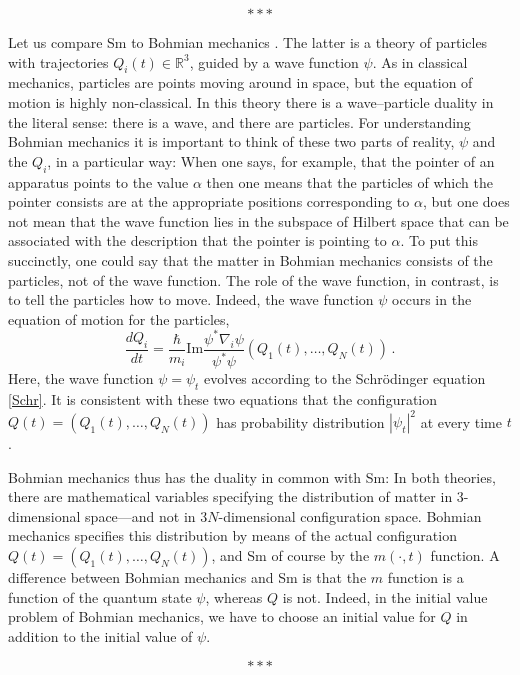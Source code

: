 \documentclass[12pt]{article}
\renewcommand{\Im}{\mathrm{Im}}
\newcommand{\RRR}{\mathbb{R}}
\begin{document}
\[***\]

Let us compare Sm to Bohmian mechanics \cite{Bohm52,Bell66,Gol98}. The latter is a theory of particles with trajectories $Q_i(t) \in \RRR^3$, guided by a wave function $\psi$. As in classical mechanics, particles are points moving around in space, but the equation of motion is highly non-classical. In this theory there is a wave--particle duality in the literal sense: there is a wave, and there are particles. For understanding Bohmian mechanics it is important to think of these two parts of reality, $\psi$ and the $Q_i$, in a particular way: When one says, for example, that the pointer of an apparatus points to the value $\alpha$ then one means that the particles of which the pointer consists are at the appropriate positions corresponding to $\alpha$, but one does not mean that the wave function lies in the subspace of Hilbert space that can be associated with the description that the pointer is pointing to $\alpha$. To put this succinctly, one could say that the matter in Bohmian mechanics consists of the particles, not of the wave function. The role of the wave function, in contrast, is to tell the particles how to move. Indeed, the wave function $\psi$ occurs in the equation of motion for the particles,
\begin{equation}\label{Bohm}
  \frac{dQ_i}{dt} = \frac{\hbar}{m_i} \Im \frac{\psi^*\nabla_i \psi}{\psi^*\psi}(Q_1(t), \ldots, Q_N(t))\,.
\end{equation}
Here, the wave function $\psi=\psi_t$ evolves according to the Schr\"odinger equation \eqref{Schr}. It is consistent with these two equations that the configuration $Q(t) = (Q_1(t), \ldots, Q_N(t))$ has probability distribution $|\psi_t|^2$ at every time $t$.

Bohmian mechanics thus has the duality in common with Sm: In both theories, there are mathematical variables specifying the distribution of matter in 3-dimensional space---and not in $3N$-dimensional configuration space. Bohmian mechanics specifies this distribution by means of the actual configuration $Q(t) = (Q_1(t), \ldots, Q_N(t))$, and Sm of course by the $m(\cdot,t)$ function. A difference between Bohmian mechanics and Sm is that the $m$ function is a function of the quantum state $\psi$, whereas $Q$ is not. Indeed, in the initial value problem of Bohmian mechanics, we have to choose an initial value for $Q$ in addition to the initial value of $\psi$.

\[***\]
\end{document}
